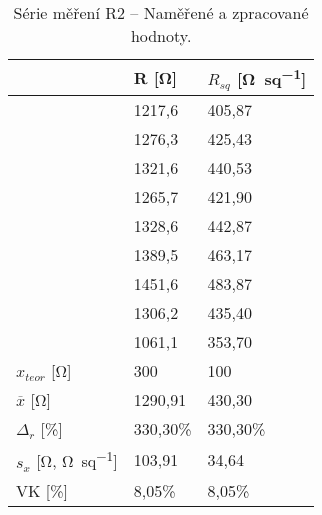 \begin{table}[h!]
    \caption{Série měření R2 -- Naměřené a zpracované hodnoty.}
    \centering
    \def\arraystretch{1.4}
    \begin{tabular}{l|l|l}
                            & R [\unit{\ohm}]    & \(R_{sq}\) [\unit{\ohm\per sq}]  \\ \hline\hline
                            & 1217,6 & 405,87 \\ \hline
                            & 1276,3 & 425,43 \\ \hline
                            & 1321,6 & 440,53 \\ \hline
                            & 1265,7 & 421,90 \\ \hline
                            & 1328,6 & 442,87 \\ \hline
                            & 1389,5 & 463,17 \\ \hline
                            & 1451,6 & 483,87 \\ \hline
                            & 1306,2 & 435,40 \\ \hline
                            & 1061,1 & 353,70 \\ \hline\hline
        \(x_{teor} \) [\unit{\ohm}]      & 300    & 100    \\ \hline
        \(\overline{x} \) [\unit{\ohm}]  & 1290,91  & 430,30 \\ \hline
        \(\Delta_{r} \) [\unit{\percent}]    &  330,30\%& 330,30\%\\ \hline\hline
        \(s_{x} \) [\unit{\ohm}, \unit{\ohm\per sq}]         &  103,91  & 34,64   \\ \hline
        VK [\unit{\percent}]                 &  8,05\% & 8,05\% \\ 
    \end{tabular}
    \label{tab:r2_hodnoty}
\end{table}

